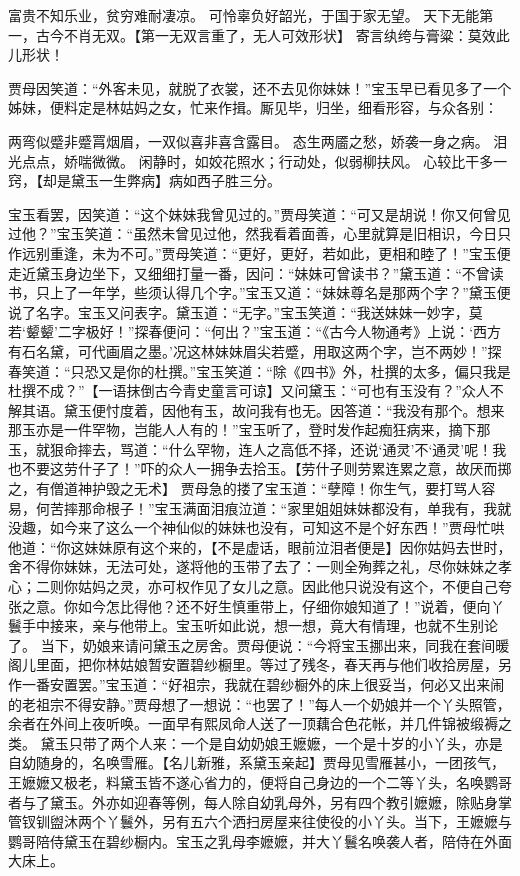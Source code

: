 \documentclass[12pt,oneside]{book}
\begin{document}
富贵不知乐业，贫穷难耐凄凉。
可怜辜负好韶光，于国于家无望。
天下无能第一，古今不肖无双。【第一无双言重了，无人可效形状】
寄言纨绔与膏粱：莫效此儿形状！

贾母因笑道：“外客未见，就脱了衣裳，还不去见你妹妹！”宝玉早已看见多了一个姊妹，便料定是林姑妈之女，忙来作揖。厮见毕，归坐，细看形容，与众各别：

两弯似蹙非蹙罥烟眉，一双似喜非喜含露目。
态生两靥之愁，娇袭一身之病。
泪光点点，娇喘微微。
闲静时，如姣花照水；行动处，似弱柳扶风。
心较比干多一窍，【却是黛玉一生弊病】病如西子胜三分。

宝玉看罢，因笑道：“这个妹妹我曾见过的。”贾母笑道：“可又是胡说！你又何曾见过他？”宝玉笑道：“虽然未曾见过他，然我看着面善，心里就算是旧相识，今日只作远别重逢，未为不可。”贾母笑道：“更好，更好，若如此，更相和睦了！”宝玉便走近黛玉身边坐下，又细细打量一番，因问：“妹妹可曾读书？”黛玉道：“不曾读书，只上了一年学，些须认得几个字。”宝玉又道：“妹妹尊名是那两个字？”黛玉便说了名字。宝玉又问表字。黛玉道：“无字。”宝玉笑道：“我送妹妹一妙字，莫若‘颦颦’二字极好！”探春便问：“何出？”宝玉道：“《古今人物通考》上说：‘西方有石名黛，可代画眉之墨。’况这林妹妹眉尖若蹙，用取这两个字，岂不两妙！”探春笑道：“只恐又是你的杜撰。”宝玉笑道：“除《四书》外，杜撰的太多，偏只我是杜撰不成？”【一语抹倒古今青史童言可谅】又问黛玉：“可也有玉没有？”众人不解其语。黛玉便忖度着，因他有玉，故问我有也无。因答道：“我没有那个。想来那玉亦是一件罕物，岂能人人有的！”宝玉听了，登时发作起痴狂病来，摘下那玉，就狠命摔去，骂道：“什么罕物，连人之高低不择，还说‘通灵’不‘通灵’呢！我也不要这劳什子了！”吓的众人一拥争去拾玉。【劳什子则劳累连累之意，故厌而掷之，有僧道神护毁之无术】
贾母急的搂了宝玉道：“孽障！你生气，要打骂人容易，何苦摔那命根子！”宝玉满面泪痕泣道：“家里姐姐妹妹都没有，单我有，我就没趣，如今来了这么一个神仙似的妹妹也没有，可知这不是个好东西！”贾母忙哄他道：“你这妹妹原有这个来的，【不是虚话，眼前泣泪者便是】因你姑妈去世时，舍不得你妹妹，无法可处，遂将他的玉带了去了：一则全殉葬之礼，尽你妹妹之孝心；二则你姑妈之灵，亦可权作见了女儿之意。因此他只说没有这个，不便自己夸张之意。你如今怎比得他？还不好生慎重带上，仔细你娘知道了！”说着，便向丫鬟手中接来，亲与他带上。宝玉听如此说，想一想，竟大有情理，也就不生别论了。
当下，奶娘来请问黛玉之房舍。贾母便说：“今将宝玉挪出来，同我在套间暖阁儿里面，把你林姑娘暂安置碧纱橱里。等过了残冬，春天再与他们收拾房屋，另作一番安置罢。”宝玉道：“好祖宗，我就在碧纱橱外的床上很妥当，何必又出来闹的老祖宗不得安静。”贾母想了一想说：“也罢了！”每人一个奶娘并一个丫头照管，余者在外间上夜听唤。一面早有熙凤命人送了一顶藕合色花帐，并几件锦被缎褥之类。
黛玉只带了两个人来：一个是自幼奶娘王嬷嬷，一个是十岁的小丫头，亦是自幼随身的，名唤雪雁。【名儿新雅，系黛玉亲起】贾母见雪雁甚小，一团孩气，王嬷嬷又极老，料黛玉皆不遂心省力的，便将自己身边的一个二等丫头，名唤鹦哥者与了黛玉。外亦如迎春等例，每人除自幼乳母外，另有四个教引嬷嬷，除贴身掌管钗钏盥沐两个丫鬟外，另有五六个洒扫房屋来往使役的小丫头。当下，王嬷嬷与鹦哥陪侍黛玉在碧纱橱内。宝玉之乳母李嬷嬷，并大丫鬟名唤袭人者，陪侍在外面大床上。
\end{document}
